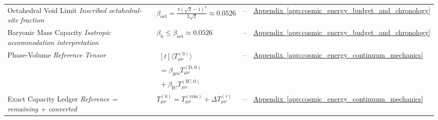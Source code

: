 \begin{longtable}{@{} p{4.5cm} p{6cm} c p{4cm} @{}}
{\raggedright Octahedral Void Limit \newline \textit{Inscribed octahedral-site fraction}\par} & {\raggedright $\beta_{\mathrm{oct}} = \frac{\pi(\sqrt{2}-1)^3}{3\sqrt{2}} \approx 0.0526$\par} & -- & {\raggedright \hyperref[app:cosmic_energy_budget_and_chronology]{Appendix~\ref*{app:cosmic_energy_budget_and_chronology}}\par} \\

{\raggedright Baryonic Mass Capacity \newline \textit{Isotropic accommodation interpretation}\par} & {\raggedright $\beta_{\mathrm{b}} \le \beta_{\mathrm{oct}} \approx 0.0526$\par} & -- & {\raggedright \hyperref[app:cosmic_energy_budget_and_chronology]{Appendix~\ref*{app:cosmic_energy_budget_and_chronology}}\par} \\

{\raggedright Phase-Volume \newline \textit{Reference Tensor}\par} & {\raggedright $\begin{gathered}[t]\langle T_{\mu\nu}^{(0)}\rangle \\ =\beta_{\mathrm{geo}}T_{\mu\nu}^{(\mathrm D,0)} \\ {}+\beta_{\mathrm{IC}}T_{\mu\nu}^{(\mathrm{IC},0)}\end{gathered}$\par} & -- & {\raggedright \hyperref[app:cosmic_energy_continuum_mechanics]{Appendix~\ref*{app:cosmic_energy_continuum_mechanics}}\par} \\

{\raggedright Exact Capacity Ledger \newline \textit{Reference = remaining + converted}\par} & {\raggedright $T_{\mu\nu}^{(0)} = T_{\mu\nu}^{(\mathrm{rem})} + \Delta T_{\mu\nu}^{(\tau)}$\par} & -- & {\raggedright \hyperref[app:cosmic_energy_continuum_mechanics]{Appendix~\ref*{app:cosmic_energy_continuum_mechanics}}\par} \\


\end{longtable}
